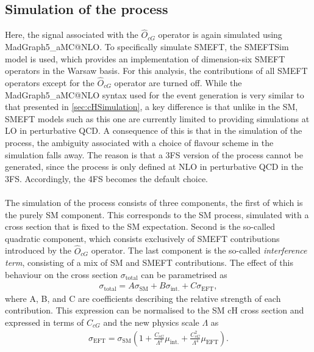 \subsection{Simulation of the \cHZZCMD process}
Here, the signal associated with the $\hat{O}_{cG}$ operator is again simulated using \textsf{MadGraph5\_aMC@NLO}. To specifically simulate SMEFT, the \textsf{SMEFTSim} model \cite{SMEFTSim1}\cite{SMEFTSim2} is used, which provides an implementation of dimension-six SMEFT operators in the Warsaw basis. For this analysis, the contributions of all SMEFT operators except for the $\hat{O}_{cG}$ operator are turned off. While the \textsf{MadGraph5\_aMC@NLO} syntax used for the event generation is very similar to that presented in \autoref{sec:cHSimulation}, a key difference is that unlike in the SM, SMEFT models such as this one are currently limited to providing simulations at LO in perturbative QCD. A consequence of this is that in the simulation of the \cHZZCMD process, the ambiguity associated with a choice of flavour scheme in the simulation falls away. The reason is that a 3FS version of the \cHZZCMD process cannot be generated, since the process is only defined at NLO in perturbative QCD in the 3FS. Accordingly, the 4FS becomes the default choice. \\
\\
The simulation of the \cHZZCMD process consists of three components, the first of which is the purely SM component. This corresponds to the SM \cHZZ process, simulated with a cross section that is fixed to the SM expectation. Second is the so-called quadratic component, which consists exclusively of SMEFT contributions introduced by the $\hat{O}_{cG}$ operator. The last component is the so-called \textit{interference term}, consisting of a mix of SM and SMEFT contributions. The effect of this behaviour on the \cHZZCMD cross section $\sigma_{\mathrm{total}}$ can be parametrised as
\begin{align}
\label{eq:CMDScaling}
    \sigma_{\mathrm{total}} = A \sigma_{\mathrm{SM}} + B \sigma_{\mathrm{int.}} + C \sigma_{\mathrm{EFT}},
\end{align}
where A, B, and C are coefficients describing the relative strength of each contribution. This expression can be normalised to the SM cH cross section and expressed in terms of $C_{cG}$ and the new physics scale $\Lambda$ as 
\begin{align}
\label{eq:CMDScalingPoly}
    \sigma_{\mathrm{EFT}} = \sigma_{\mathrm{SM}} (1 +  \frac{C_{cG}}{\Lambda^2} \mu_{\mathrm{int.}} + \frac{C^2_{cG}}{\Lambda^4} \mu_{\mathrm{EFT}}).
\end{align}

